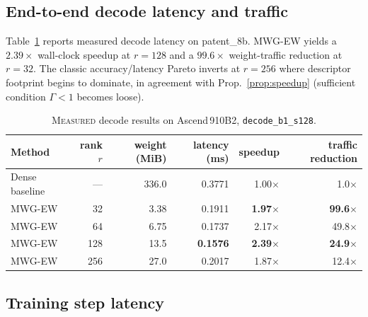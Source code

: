 \documentclass[11pt]{article}
\theoremstyle{definition}
\begin{document}
\subsection{End-to-end decode latency and traffic}

Table~\ref{tab:decode} reports measured decode latency on patent\_8b. MWG-EW yields a $2.39\times$ wall-clock speedup at $r{=}128$ and a $99.6\times$ weight-traffic reduction at $r{=}32$. The classic accuracy/latency Pareto inverts at $r{=}256$ where descriptor footprint begins to dominate, in agreement with Prop.~\ref{prop:speedup} (sufficient condition $\Gamma{<}1$ becomes loose).

\begin{table}[h]
\centering
\caption{\textsc{Measured} decode results on Ascend\,910B2, \texttt{decode\_b1\_s128}.}
\label{tab:decode}
\small
\begin{tabular}{@{}lrrrrr@{}}
\toprule
Method & rank $r$ & weight (MiB) & latency (ms) & speedup & traffic reduction \\
\midrule
Dense baseline & --- & 336.0 & 0.3771 & 1.00$\times$ & 1.0$\times$ \\
MWG-EW & 32  & 3.38  & 0.1911 & \textbf{1.97$\times$} & \textbf{99.6$\times$} \\
MWG-EW & 64  & 6.75  & 0.1737 & 2.17$\times$ & 49.8$\times$ \\
\rowcolor{gray!10}
MWG-EW & 128 & 13.5  & \textbf{0.1576} & \textbf{2.39$\times$} & \textbf{24.9$\times$} \\
MWG-EW & 256 & 27.0  & 0.2017 & 1.87$\times$ & 12.4$\times$ \\
\bottomrule
\end{tabular}
\end{table}

\subsection{Training step latency}
\end{document}
